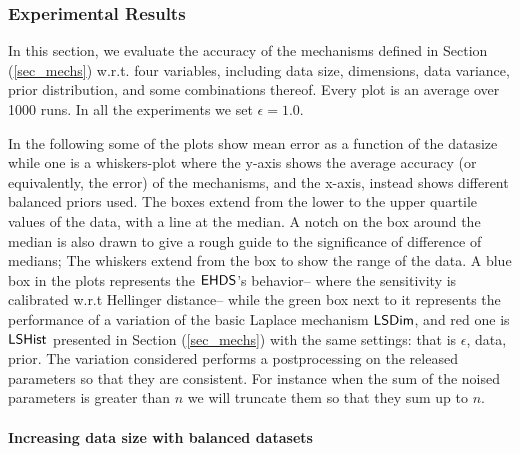 \documentclass{article}
\begin{document}
\subsubsection{Experimental Results}
\label{subsec_vs_variables}

In this section, we evaluate the accuracy of the mechanisms defined in
Section (\ref{sec_mechs}) w.r.t. four variables, including data size, dimensions,
data variance, prior distribution, and some combinations thereof.
Every plot is an average over 1000 runs. In all the experiments we set
$\epsilon = 1.0$.

\noindent In the following some of the plots show
mean error as a function of the datasize while one
is a whiskers-plot where the y-axis shows the average
accuracy (or equivalently, the error) of the mechanisms, and the x-axis, instead shows
different balanced priors used. The boxes extend from the lower to the upper quartile values
of the data, with a line at the median. A notch on the box around the
median is also drawn to give a rough guide to the significance of
difference of medians; The whiskers extend from the box to show the
range of the data. A blue box in the plots represents the $\mathsf{EHDS}$'s behavior-- where the sensitivity is calibrated
w.r.t Hellinger distance-- while the green box next to
it represents the performance of a variation of the basic Laplace
mechanism $\mathsf{LSDim}$, and red one is $\mathsf{LSHist}$ presented in Section (\ref{sec_mechs}) with the same
settings: that is $\epsilon$, data, prior. The variation
considered performs a postprocessing on the released parameters so
that they are consistent. For instance when the sum of the noised
parameters is greater than $n$ we will truncate them so that they sum
up to $n$.

\paragraph{Increasing data size with balanced datasets}
\label{subsubsec_vs_datasize}


\begin{figure}[ht]
\begin{center}
\centering
{}

\end{center}
\end{figure}
\end{document}
